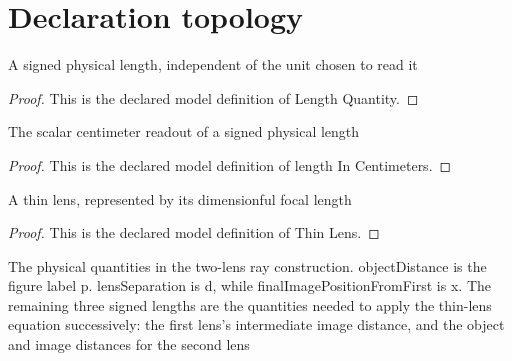 \section{Declaration topology}
\begin{definition}
  \label{def:physics:phyx-mini-0031:phyxminiproblems-problemphyxmini0031-lengthquantity}
  A signed physical length, independent of the unit chosen to read it
\end{definition}
\begin{proof}
  This is the declared model definition of Length Quantity.
\end{proof}
\begin{definition}
  \label{def:physics:phyx-mini-0031:phyxminiproblems-problemphyxmini0031-lengthincentimeters}
  The scalar centimeter readout of a signed physical length
\end{definition}
\begin{proof}
  This is the declared model definition of length In Centimeters.
\end{proof}
\begin{definition}
  \label{def:physics:phyx-mini-0031:phyxminiproblems-problemphyxmini0031-thinlens}
  A thin lens, represented by its dimensionful focal length
\end{definition}
\begin{proof}
  This is the declared model definition of Thin Lens.
\end{proof}
\begin{definition}
  \label{def:physics:phyx-mini-0031:phyxminiproblems-problemphyxmini0031-twolenssetup}
  The physical quantities in the two-lens ray construction. objectDistance is the figure label p. lensSeparation is d, while finalImagePositionFromFirst is x. The remaining three signed lengths are the quantities needed to apply the thin-lens equation successively: the first lens's intermediate image distance, and the object and image distances for the second lens
\end{definition}
